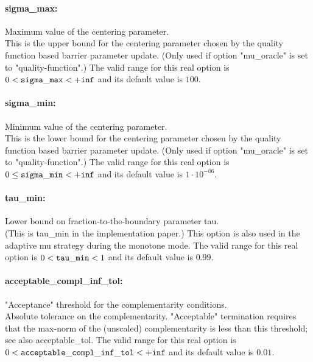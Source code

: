 \paragraph{sigma\_max:}\label{sec:sigma_max} Maximum value of the centering parameter. $\;$ \\
 This is the upper bound for the centering
parameter chosen by the quality function based
barrier parameter update. (Only used if option
"mu\_oracle" is set to "quality-function".) The valid range for this real option is 
$0 <  {\tt sigma\_max } <  {\tt +inf}$
and its default value is $100$.


\paragraph{sigma\_min:}\label{sec:sigma_min} Minimum value of the centering parameter. $\;$ \\
 This is the lower bound for the centering
parameter chosen by the quality function based
barrier parameter update. (Only used if option
"mu\_oracle" is set to "quality-function".) The valid range for this real option is 
$0 \le {\tt sigma\_min } <  {\tt +inf}$
and its default value is $1 \cdot 10^{-06}$.


\paragraph{tau\_min:}\label{sec:tau_min} Lower bound on fraction-to-the-boundary parameter tau. $\;$ \\
 (This is tau\_min in the implementation paper.) 
This option is also used in the adaptive mu
strategy during the monotone mode. The valid range for this real option is 
$0 <  {\tt tau\_min } <  1$
and its default value is $0.99$.


\paragraph{acceptable\_compl\_inf\_tol:}\label{sec:acceptable_compl_inf_tol} "Acceptance" threshold for the complementarity conditions. $\;$ \\
 Absolute tolerance on the complementarity.
"Acceptable" termination requires that the
max-norm of the (unscaled) complementarity is
less than this threshold; see also
acceptable\_tol. The valid range for this real option is 
$0 <  {\tt acceptable\_compl\_inf\_tol } <  {\tt +inf}$
and its default value is $0.01$.


